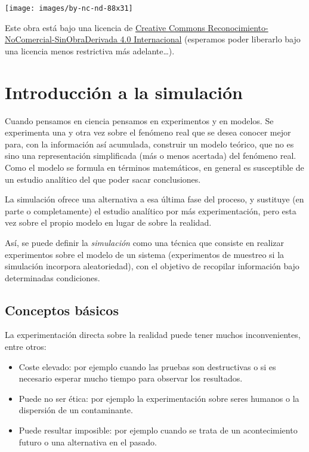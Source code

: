 \documentclass[
]{book}
\theoremstyle{break}
\theoremstyle{nonumberplain}
\begin{document}
\begin{flushleft}\texttt{[image: images/by-nc-nd-88x31]} \end{flushleft}

Este obra está bajo una licencia de \href{https://creativecommons.org/licenses/by-nc-nd/4.0/deed.es_ES}{Creative Commons Reconocimiento-NoComercial-SinObraDerivada 4.0 Internacional}
(esperamos poder liberarlo bajo una licencia menos restrictiva más adelante\ldots).

\hypertarget{intro}{%
\chapter{Introducción a la simulación}\label{intro}}

Cuando pensamos en ciencia pensamos en experimentos y en modelos.
Se experimenta una y otra vez sobre el fenómeno real que se desea conocer mejor para, con la información así acumulada, construir un modelo teórico, que no es sino una representación simplificada (más o menos acertada) del fenómeno real.
Como el modelo se formula en términos matemáticos, en general es susceptible de un estudio analítico del que poder sacar conclusiones.

La simulación ofrece una alternativa a esa última fase del proceso, y sustituye (en parte o completamente) el estudio analítico por más experimentación, pero esta vez sobre el propio modelo en lugar de sobre la realidad.

Así, se puede definir la \emph{simulación} como una técnica que consiste en realizar experimentos sobre el modelo de un sistema (experimentos de muestreo si la simulación incorpora aleatoriedad), con el objetivo de recopilar información bajo determinadas condiciones.

\hypertarget{conceptos}{%
\section{Conceptos básicos}\label{conceptos}}

La experimentación directa sobre la realidad puede tener muchos inconvenientes, entre otros:

\begin{itemize}
\item
  Coste elevado: por ejemplo cuando las pruebas son destructivas o si es necesario esperar mucho tiempo para observar los resultados.
\item
  Puede no ser ética: por ejemplo la experimentación sobre seres humanos o la dispersión de un contaminante.
\item
  Puede resultar imposible: por ejemplo cuando se trata de un acontecimiento futuro o una alternativa en el pasado.
\end{itemize}
\end{document}
